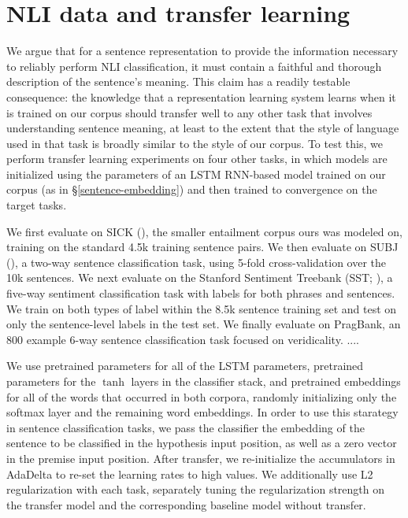 \section{NLI data and transfer learning}\label{sec:transfer}

We argue that for a sentence representation to provide the information necessary to reliably perform NLI classification, it must contain a faithful and thorough description of the sentence's meaning. This claim has a readily testable consequence: the knowledge that a representation learning system learns when it is trained on our corpus should transfer well to any other task that involves understanding sentence meaning, at least to the extent that the style of language used in that task is broadly similar to the style of our corpus. To test this, we perform transfer learning experiments on four other tasks, in which models are initialized using the parameters of an LSTM RNN-based model trained on our corpus (as in \S\ref{sentence-embedding}) and then trained to convergence on the target tasks. 

We first evaluate on SICK (\citealt{marelli2014sick}), the smaller entailment corpus ours was modeled on, training on the standard 4.5k training sentence pairs. We then evaluate on SUBJ (\citealt{pang2004sentimental}), a two-way sentence classification task, using 5-fold cross-validation over the 10k sentences. We next evaluate on the Stanford Sentiment Treebank (SST; \citealt{socher2013acl1}), a five-way sentiment classification task with labels for both phrases and sentences. We train on both types of label within the 8.5k sentence training set and test on only the sentence-level labels in the test set. We finally evaluate on PragBank, an 800 example 6-way sentence classification task focused on veridicality.  ....
\noindent{}

We use pretrained parameters for all of the LSTM parameters, pretrained parameters for the $\tanh$ layers in the classifier stack, and pretrained embeddings for all of the words that occurred in both corpora, randomly initializing only the softmax layer and the remaining word embeddings. In order to use this starategy in sentence classification tasks, we pass the classifier the embedding of the sentence to be classified in the hypothesis input position, as well as a zero vector in the premise input position. After transfer, we re-initialize the accumulators in AdaDelta to re-set the learning rates to high values. We additionally use L2 regularization with each task, separately tuning the regularization strength on the transfer model and the corresponding baseline model without transfer.

